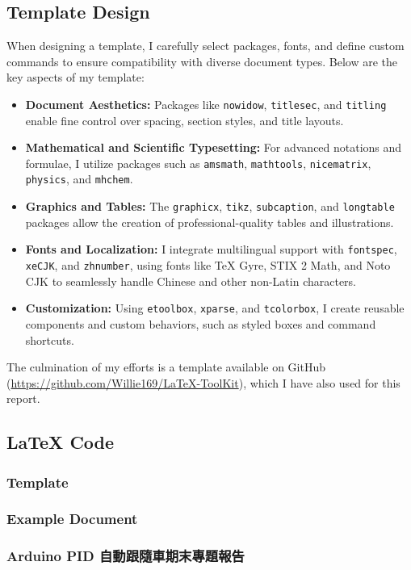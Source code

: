 \documentclass[a4paper,12pt]{article}
\newcounter{xeCJK}
\newcounter{Fonts}
\begin{document}
\subsection{Template Design}
When designing a template, I carefully select packages, fonts, and define custom commands to ensure compatibility with diverse document types. Below are the key aspects of my template:  
\begin{itemize}  
\item \textbf{Document Aesthetics:} Packages like \texttt{nowidow}, \texttt{titlesec}, and \texttt{titling} enable fine control over spacing, section styles, and title layouts.  
\item \textbf{Mathematical and Scientific Typesetting:} For advanced notations and formulae, I utilize packages such as \texttt{amsmath}, \texttt{mathtools}, \texttt{nicematrix}, \texttt{physics}, and \texttt{mhchem}.  
\item \textbf{Graphics and Tables:} The \texttt{graphicx}, \texttt{tikz}, \texttt{subcaption}, and \texttt{longtable} packages allow the creation of professional-quality tables and illustrations.  
\item \textbf{Fonts and Localization:} I integrate multilingual support with \texttt{fontspec}, \texttt{xeCJK}, and \texttt{zhnumber}, using fonts like TeX Gyre, STIX 2 Math, and Noto CJK to seamlessly handle Chinese and other non-Latin characters.  
\item \textbf{Customization:} Using \texttt{etoolbox}, \texttt{xparse}, and \texttt{tcolorbox}, I create reusable components and custom behaviors, such as styled boxes and command shortcuts.  
\end{itemize}
The culmination of my efforts is a template available on GitHub (\href{https://github.com/Willie169/LaTeX-ToolKit}{https://github.com/Willie169/LaTeX-ToolKit}), which I have also used for this report.  
\subsection{\LaTeX{} Code}
\subsubsection{Template}

\subsubsection{Example Document}

\subsubsection{Arduino PID 自動跟隨車期末專題報告}

\end{document}
